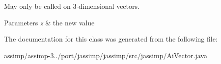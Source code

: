 May only be called on 3-\/dimensional vectors.


\begin{DoxyParams}{Parameters}
{\em z} & the new value \\
\hline
\end{DoxyParams}


The documentation for this class was generated from the following file\+:\begin{DoxyCompactItemize}
\item 
assimp/assimp-\/3../port/jassimp/jassimp/src/jassimp/Ai\+Vector.\+java\end{DoxyCompactItemize}
